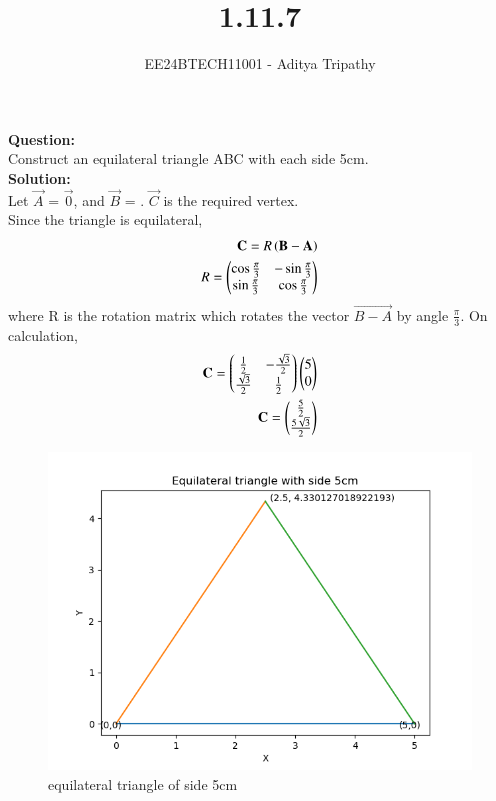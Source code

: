 \documentclass[journal]{IEEEtran}
\begin{document}

\vspace{3cm}

\title{1.11.7}
\author{EE24BTECH11001 - Aditya Tripathy
}
{\let\newpage\relax\maketitle}

\renewcommand{\thefigure}{\theenumi}
\renewcommand{\thetable}{\theenumi}
\setlength{\intextsep}{10pt} %

\textbf{Question:}\\
Construct an equilateral triangle ABC with each side 5cm.
\\
\textbf{Solution:}\\
Let $\vec{A}$ = $\vec{0}$, and $\vec{B}$ = . $\vec{C}$ is the required vertex.\\ Since the triangle is equilateral,
\begin{align}
    \mathbf{C} = R\left(\mathbf{B-A}\right)\\
    R = \begin{pmatrix}\cos \frac{\pi}{3} & -\sin \frac{\pi}{3} \\ \sin \frac{\pi}{3} & \cos \frac{\pi}{3}\end{pmatrix}
\end{align}
where R is the rotation matrix which rotates the vector $\vec{B-A}$ by angle $\frac{\pi}{3}$. On calculation,
\begin{align}
    \mathbf{C} = \begin{pmatrix}\frac{1}{2} & -\frac{\sqrt{3}}{2}\\ \frac{\sqrt{3}}{2} & \frac{1}{2}\end{pmatrix} \begin{pmatrix}5\\0\end{pmatrix}\\
    \mathbf{C} = \begin{pmatrix}\frac{5}{2} \\ \frac{5\sqrt{3}}{2}\end{pmatrix}
\end{align}
\begin{figure}[h!]
   \centering
   \includegraphics[width=0.7\linewidth]{figs/fig.png}
   \caption{equilateral triangle of side 5cm}
\end{figure}
\end{document}
